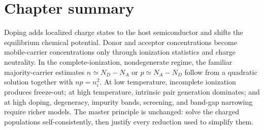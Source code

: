 \section{Chapter summary}

Doping adds localized charge states to the host semiconductor and shifts the
equilibrium chemical potential.  Donor and acceptor concentrations become
mobile-carrier concentrations only through ionization statistics and charge
neutrality.  In the complete-ionization, nondegenerate regime, the familiar
majority-carrier estimates $n\simeq N_D-N_A$ or
$p\simeq N_A-N_D$ follow from a quadratic solution together with
$np=n_i^2$.  At low temperature, incomplete ionization produces freeze-out; at
high temperature, intrinsic pair generation dominates; and at high doping,
degeneracy, impurity bands, screening, and band-gap narrowing require richer
models.  The master principle is unchanged: solve the charged populations
self-consistently, then justify every reduction used to simplify them.
